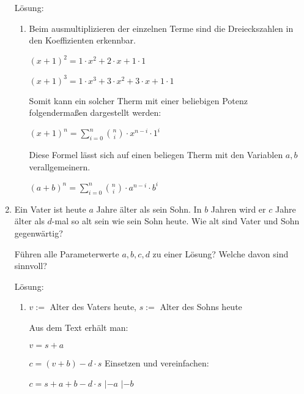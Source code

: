 \documentclass[../main.tex]{subfiles}
\begin{document}
\begin{enumerate}
	      Lösung:
	      \begin{enumerate}
		      \item Beim ausmultiplizieren der einzelnen Terme sind die Dreieckszahlen in den Koeffizienten erkennbar.

		            \(
		            (x + 1)^2 = 1 \cdot x^2 + 2 \cdot x + 1 \cdot 1
		            \)

		            \(
		            (x + 1)^3 = 1 \cdot x^3 + 3 \cdot x^2 + 3 \cdot x + 1 \cdot 1
		            \)

		            Somit kann ein solcher Therm mit einer beliebigen Potenz folgendermaßen dargestellt werden:

		            \(
		            (x + 1)^n = \sum_{i = 0}^{n} \binom{n}{i} \cdot x^{n-i} \cdot 1^i
		            \)

		            Diese Formel lässt sich auf einen beliegen Therm mit den Variablen \(
		            a, b
		            \) verallgemeinern.

		            \(
		            (a + b)^n = \sum_{i = 0}^{n} \binom{n}{i} \cdot a^{n-i} \cdot b^i
		            \)
	      \end{enumerate}
	\item Ein Vater ist heute \(
	      a
	      \) Jahre älter als sein Sohn.
	      In \(
	      b
	      \) Jahren wird er \(
	      c
	      \) Jahre älter als \(
	      d
	      \)-mal so alt sein wie sein Sohn heute.
	      Wie alt sind Vater und Sohn gegenwärtig?

	      Führen alle Parameterwerte \(
	      a, b, c, d
	      \) zu einer Lösung?
	      Welche davon sind sinnvoll?

	      Lösung:
	      \begin{enumerate}
		      \item
		            \(
		            v :=
		            \) Alter des Vaters heute,
		            \(
		            s :=
		            \) Alter des Sohns heute

		            Aus dem Text erhält man:

		            \(
		            v = s + a
		            \)

		            \(
		            c = (v + b) - d \cdot s
		            \)
		            Einsetzen und vereinfachen:

		            \(
		            c = s + a + b - d \cdot s
		            \)
		            \(|\)\(
		            - a
		            \)
		            \(|\)\(
		            - b
		            \)


\end{enumerate}
\end{enumerate}
\end{document}
